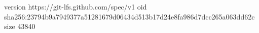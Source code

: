 version https://git-lfs.github.com/spec/v1
oid sha256:23794b9a7949377a51281679d06434d513b17d24e8fa986d7dcc265a063dd62c
size 43840

